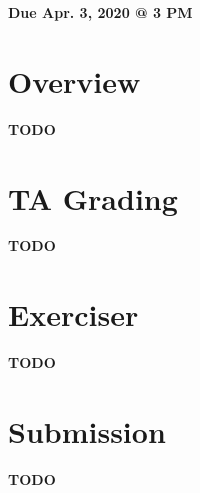 \documentclass[11pt]{article}
\makeatletter
\def\datedue{Apr. 3, 2020 @ 3 PM}
\makeatother
\begin{document}
\maketitle \thispagestyle{fancy}

\hfill {\large \textbf{Due \datedue}}


\section{Overview}
\label{sec:overview}
\textbf{TODO}

\section{TA Grading}
\label{sec:tagrading}
\textbf{TODO}

\section{Exerciser}
\label{sec:exercise}
\textbf{TODO}

\section{Submission}
\label{sec:submission}
\textbf{TODO}
\end{document}
